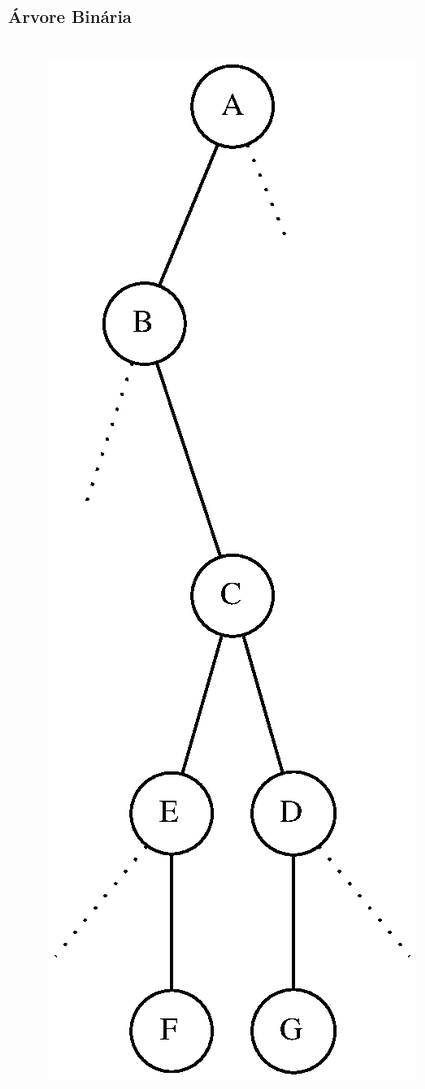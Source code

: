 \documentclass[aspectratio=169]{beamer}
\begin{document}
\begin{frame}\frametitle{Árvore Binária}
\begin{columns}[T]
\begin{column}{0.2\linewidth}
\begin{figure}[h]
	\centering
	\includegraphics[height=0.70\paperheight]{imagens/arvore_binaria03.eps}

\end{figure}
\end{column}
\end{columns}
\end{frame}
\end{document}
